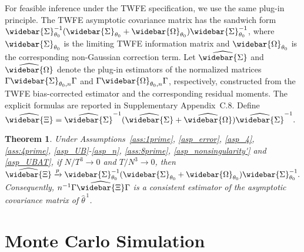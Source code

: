 \documentclass[11pt,a4paper]{article}
\newtheorem{theorem}{Theorem}
\begin{document}
For feasible inference under the TWFE specification, we use the same plug-in
principle. The TWFE asymptotic covariance matrix has the sandwich form
\(
\widebar{\Sigma}_{\theta_0}^{-1}
(\widebar{\Sigma}_{\theta_0}+\widebar{\Omega}_{\theta_0})
\widebar{\Sigma}_{\theta_0}^{-1}
\),
where \(\widebar{\Sigma}_{\theta_0}\) is the limiting TWFE information matrix
and \(\widebar{\Omega}_{\theta_0}\) is the corresponding non-Gaussian correction
term. Let \(\widehat{\widebar{\Sigma}}\) and
\(\widehat{\widebar{\Omega}}\) denote the plug-in estimators of the normalized
matrices \(\Gamma\widebar{\Sigma}_{\theta_0,n}\Gamma\) and
\(\Gamma\widebar{\Omega}_{\theta_0,n}\Gamma\), respectively, constructed from
the TWFE bias-corrected estimator and the corresponding residual moments. The explicit formulas are reported in Supplementary Appendix~C.8. Define
\(
\widehat{\widebar{\Xi}}
=
\widehat{\widebar{\Sigma}}^{-1}
(\widehat{\widebar{\Sigma}}+\widehat{\widebar{\Omega}})
\widehat{\widebar{\Sigma}}^{-1}.
\)

\begin{theorem}
Under Assumptions~\ref{ass:1prime}, \ref{asp_error}, \ref{asp_4}, \ref{ass:4prime}, \ref{asp_UB}-\ref{asp_n}, \ref{ass:8prime}, \ref{asp_nonsingularity'} and \ref{asp_UBAT},
if \(N/T^3\to0\) and \(T/N^3\to0\), then
\(
\widehat{\widebar{\Xi}}
\xrightarrow{p}
\widebar{\Sigma}_{\theta_0}^{-1}
(\widebar{\Sigma}_{\theta_0}+\widebar{\Omega}_{\theta_0})
\widebar{\Sigma}_{\theta_0}^{-1}.
\)
Consequently, \(n^{-1}\Gamma\widehat{\widebar{\Xi}}\Gamma\) is a consistent
estimator of the asymptotic covariance matrix of \(\widehat{\theta}^{\,1}\).
\end{theorem}


\section{Monte Carlo Simulation}\label{section4}
\end{document}
